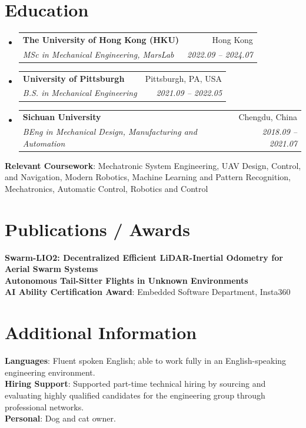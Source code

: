 \documentclass[letterpaper,11pt]{article}
\makeatletter
\newcommand{\resumeSubheading}[4]{
  \vspace{-2pt}\item
    \begin{tabular*}{0.97\textwidth}[t]{l@{\extracolsep{\fill}}r}
      \textbf{#1} & #2 \\
      \textit{\small#3} & \textit{\small #4} \\
    \end{tabular*}\vspace{-7pt}
}
\newcommand{\resumeSubHeadingListStart}{\begin{itemize}[leftmargin=0.15in, label={}]}
\newcommand{\resumeSubHeadingListEnd}{\end{itemize}}
\makeatother
\begin{document}
\section{Education}
  \resumeSubHeadingListStart
    \resumeSubheading
      {The University of Hong Kong (HKU)}{Hong Kong}
      {MSc in Mechanical Engineering, MarsLab}{2022.09 -- 2024.07}
    \resumeSubheading
      {University of Pittsburgh}{Pittsburgh, PA, USA}
      {B.S. in Mechanical Engineering}{2021.09 -- 2022.05}
    \resumeSubheading
      {Sichuan University}{Chengdu, China}
      {BEng in Mechanical Design, Manufacturing and Automation}{2018.09 -- 2021.07}
  \resumeSubHeadingListEnd
  \begin{itemize}[leftmargin=0.15in, label={}]
    \small{\item{
      \textbf{Relevant Coursework}{: Mechatronic System Engineering, UAV Design, Control, and Navigation, Modern Robotics, Machine Learning and Pattern Recognition, Mechatronics, Automatic Control, Robotics and Control}
    }}
  \end{itemize}

\section{Publications / Awards}
  \begin{itemize}[leftmargin=0.15in, label={}]
    \small{\item{
      \textbf{Swarm-LIO2: Decentralized Efficient LiDAR-Inertial Odometry for Aerial Swarm Systems} \\
      \textbf{Autonomous Tail-Sitter Flights in Unknown Environments} \\
      \textbf{AI Ability Certification Award}{: Embedded Software Department, Insta360}
    }}
 \end{itemize}

\section{Additional Information}
  \begin{itemize}[leftmargin=0.15in, label={}]
    \small{\item{
      \textbf{Languages}{: Fluent spoken English; able to work fully in an English-speaking engineering environment.} \\
      \textbf{Hiring Support}{: Supported part-time technical hiring by sourcing and evaluating highly qualified candidates for the engineering group through professional networks.} \\
      \textbf{Personal}{: Dog and cat owner.}
    }}
 \end{itemize}

\end{document}
